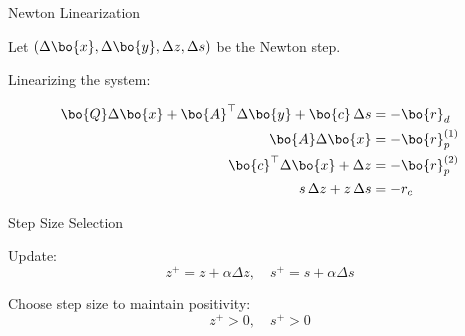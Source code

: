\documentclass{beamer}
\begin{document}
\begin{frame}{Newton Linearization}
	\begin{flushleft}
		
		Let $(\Delta \bo{x}, \Delta \bo{y}, \Delta z, \Delta s)$ be the Newton step.
		
		\vspace{0.5em}
		
		Linearizing the system:
		
		\vspace{0.5em}
		
		\begin{align*}
			\bo{Q} \Delta \bo{x} + \bo{A}^\top \Delta \bo{y} + \bo{c} \, \Delta s &= -\bo{r}_d \\
			\bo{A} \Delta \bo{x} &= -\bo{r}_p^{(1)} \\
			\bo{c}^\top \Delta \bo{x} + \Delta z &= -\bo{r}_p^{(2)} \\
			s \, \Delta z + z \, \Delta s &= -r_c
		\end{align*}
		
	\end{flushleft}
\end{frame}


\begin{frame}{Step Size Selection}
	\begin{flushleft}
		
		Update:
		\[
		z^+ = z + \alpha \Delta z, \quad s^+ = s + \alpha \Delta s
		\]
		
		\vspace{0.5em}
		
		Choose step size to maintain positivity:
		\[
		z^+ > 0, \quad s^+ > 0
		\]
		
	\end{flushleft}
\end{frame}
\end{document}
